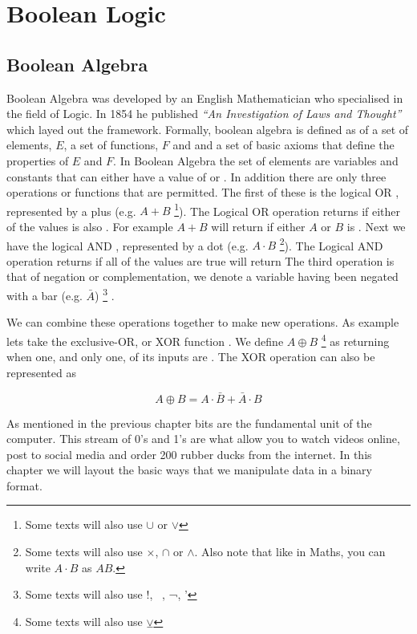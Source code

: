 
\chapter{Boolean Logic}
	\section{Boolean Algebra}
		Boolean Algebra was developed by an English Mathematician who specialised in the field of Logic. In 1854 he published \textit{ \enquote{An Investigation of Laws and Thought} \citep{Boole54}} which layed out the framework. Formally, boolean algebra is defined as of a set of elements, $E$, a set of functions, $F$ and and a set of basic axioms that define the properties of $E$ and $F$. In Boolean Algebra the set of elements are variables and constants that can either have a value of \true or \false. In addition there are only three operations or functions that are permitted. The first of these is the logical OR , represented by a plus (e.g. $A + B$ \footnote{Some texts will also use $\cup$ or $\vee$}). The Logical OR operation returns \true if either of the values is also \true. For example $A + B$ will return \true if either $A$ or $B$ is \true. Next we have the logical AND , represented by a dot (e.g. $A \cdot B$ \footnote{Some texts will also use $\times$, $\cap$ or $\wedge$. Also note that like in Maths, you can write $A \cdot B$ as $AB$.}). The Logical AND operation returns \true if all of the values are true will return The third operation is that of negation or complementation, we denote a variable having been negated with a bar (e.g. $\bar{A}$) \footnote{Some texts will also use !, ~, ¬, '} . 
		
		
		We can combine these operations together to make new operations. As example lets take the exclusive-OR, or XOR function . We define $A \oplus B$ \footnote{Some texts will also use $\veebar$} as returning \true when one, and only one, of its inputs are \true. The XOR operation can also be represented as 
		
		$$A \oplus B = A\cdot \bar{B} + \bar{A}\cdot B$$
		
		As mentioned in the previous chapter bits are the fundamental unit of the computer. This stream of 0's and 1's are what allow you to watch videos online, post to social media and order 200 rubber ducks from the internet. In this chapter we will layout the basic ways that we manipulate data in a binary format. 
		
